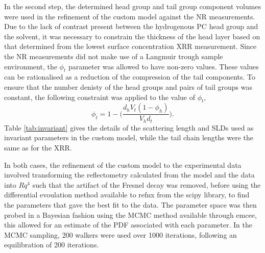 \documentclass[twoside,twocolumn,9pt]{article}
\begin{document}
In the second step, the determined head group and tail group component volumes were used in the refinement of the custom model against the NR measurements. Due to the lack of contrast present between the hydrogenous PC head group and the solvent, it was necessary to constrain the thickness of the head layer based on that determined from the lowest surface concentration XRR measurement. Since the NR measurements did not make use of a Langmuir trough sample environment, the $\phi_t$ parameter was allowed to have non-zero values. These values can be rationalised as a reduction of the compression of the tail components. To ensure that the number denisty of the head groups and pairs of tail groups was constant, the following constraint was applied to the value of $\phi_t$, 
\begin{equation}
\label{equ:phit}
\phi_t =  1 - \bigg(\frac{d_hV_t(1-\phi_h)}{V_hd_t}\bigg).
\end{equation}
Table \ref{tab:invariant} gives the details of the scattering length and SLDs used as invariant parameters in the custom model, while the tail chain lengths were the same as for the XRR. 

In both cases, the refinement of the custom model to the experimental data involved transforming the reflectometry calculated from the model and the data into $Rq^4$ such that the artifact of the Fresnel decay was removed, before using the differential evoulation method available to refnx from the scipy library,\cite{Jones2001} to find the parameters that gave the best fit to the data. The parameter space was then probed in a Bayesian fashion using the MCMC method available through emcee, this allowed for an estimate of the PDF associated with each parameter. In the MCMC sampling, 200 walkers were used over 1000 iterations, following an equilibration of 200 iterations.
\end{document}
